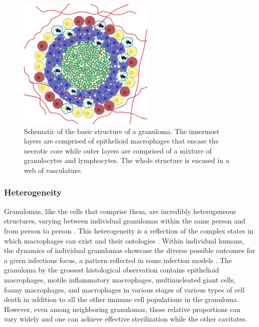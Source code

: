 \begin{figure}
\begin{center}
\includegraphics[height=2.5in]{images/granuloma2.pdf}
\caption{Schematic of the basic structure of a granuloma. The innermost layers are comprised of epithelioid macrophages that encase the necrotic core while outer layers are comprised of a mixture of granulocytes and lymphocytes. The whole structure is encased in a web of vasculature.}
\label{figure:granny}
\end{center}
\end{figure}

\subsubsection{Heterogeneity}

Granulomas, like the cells that comprise them, are incredibly heterogeneous structures, varying between individual granulomas within the same person and from person to person \citep{Matty2015, Lenaerts2015}. This heterogeneity is a reflection of the complex states in which macrophages can exist and their ontologies \citep{Kiss2018}. Within individual humans, the dynamics of individual granulomas showcase the diverse possible outcomes for a given infectious focus, a pattern reflected in some infection models \citep{Lenaerts2015, Lin2014}. The granuloma by the grossest histological observation contains epithelioid macrophages, motile inflammatory macrophages, multinucleated giant cells, foamy macrophages, and macrophages in various stages of various types of cell death in addition to all the other immune cell populations in the granuloma. However, even among neighboring granulomas, these relative proportions can vary widely and one can achieve effective sterilization while the other cavitates. 

